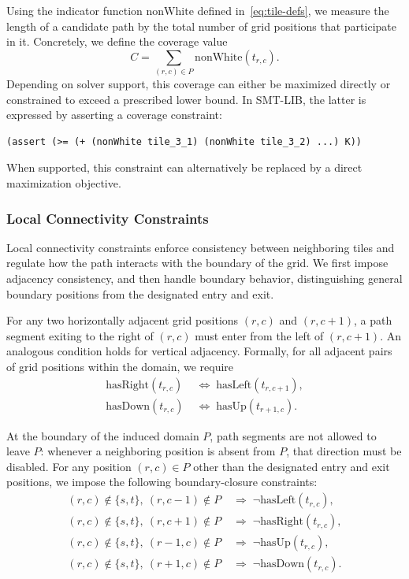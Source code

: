 \documentclass[acmsmall,screen,nonacm]{acmart}
\begin{document}
Using the indicator function \(\mathrm{nonWhite}\) defined
in~\eqref{eq:tile-defs}, we measure the length of a candidate path by
the total number of grid positions that participate in it. Concretely,
we define the coverage value
\begin{equation}
\label{eq:coverage}
C = \sum_{(r,c)\in P} \mathrm{nonWhite}(t_{r,c}).
\end{equation}
Depending on solver support, this coverage can either be maximized
directly or constrained to exceed a prescribed lower bound. In
SMT-LIB, the latter is expressed by asserting a coverage constraint:
\begin{tcolorbox}[smtsimple]
\begin{verbatim}
(assert (>= (+ (nonWhite tile_3_1) (nonWhite tile_3_2) ...) K))
\end{verbatim}
\end{tcolorbox}
When supported, this constraint can alternatively be replaced by a
direct maximization objective.

\subsubsection{Local Connectivity Constraints}
Local connectivity constraints enforce consistency between neighboring
tiles and regulate how the path interacts with the boundary of the
grid. We first impose adjacency consistency, and then handle boundary
behavior, distinguishing general boundary positions from the
designated entry and exit.

For any two horizontally adjacent grid positions \((r,c)\) and
\((r,c+1)\), a path segment exiting to the right of \((r,c)\) must
enter from the left of \((r,c+1)\). An analogous condition holds for
vertical adjacency. Formally, for all adjacent pairs of grid positions
within the domain, we require
\[
\begin{aligned}
\mathrm{hasRight}(t_{r,c}) &\;\Longleftrightarrow\;
\mathrm{hasLeft}(t_{r,c+1}), \\
\mathrm{hasDown}(t_{r,c}) &\;\Longleftrightarrow\;
\mathrm{hasUp}(t_{r+1,c}).
\end{aligned}
\]

At the boundary of the induced domain \(P\), path segments are not
allowed to leave \(P\): whenever a neighboring position is absent from
\(P\), that direction must be disabled. For any position \((r,c)\in
P\) other than the designated entry and exit positions, we impose the
following boundary-closure constraints:
\[
\begin{aligned}
(r,c)\notin\{s,t\},\ (r,c-1)\notin P
&\;\Rightarrow\; \neg \mathrm{hasLeft}(t_{r,c}), \\
(r,c)\notin\{s,t\},\ (r,c+1)\notin P
&\;\Rightarrow\; \neg \mathrm{hasRight}(t_{r,c}), \\
(r,c)\notin\{s,t\},\ (r-1,c)\notin P
&\;\Rightarrow\; \neg \mathrm{hasUp}(t_{r,c}), \\
(r,c)\notin\{s,t\},\ (r+1,c)\notin P
&\;\Rightarrow\; \neg \mathrm{hasDown}(t_{r,c}).
\end{aligned}
\]
\end{document}
